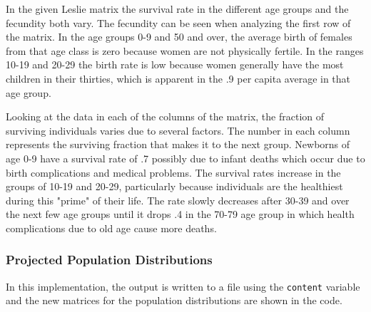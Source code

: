 \documentclass[letterpaper,12pt]{article}
\begin{document}
In the given Leslie matrix the survival rate in the different age groups and the
fecundity both vary.
The fecundity can be seen when analyzing the first row of the matrix.
In the age groups 0-9 and 50 and over, the average birth of females from that
age class is zero because women are not physically fertile.
In the ranges 10-19 and 20-29 the birth rate is low because women generally have
the most children in their thirties, which is apparent in the .9 per capita
average in that age group. 

Looking at the data in each of the columns of the matrix, the fraction of
surviving individuals varies due to several factors.
The number in each column represents the surviving fraction that makes it to the
next group.
Newborns of age 0-9 have a survival rate of .7 possibly due to infant deaths which
occur due to birth complications and medical problems.
The survival rates increase in the groups of 10-19 and 20-29, particularly
because individuals are the healthiest during this "prime" of their life.
The rate slowly decreases after 30-39 and over the next few age groups until it
drops .4 in the 70-79 age group in which health complications due to old age
cause more deaths.

\subsubsection{Projected Population Distributions}

In this implementation, the output is written to a file using the
\texttt{content} variable and the new matrices for the population distributions
are shown in the code.
\end{document}
